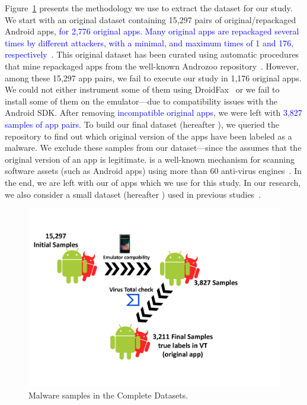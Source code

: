 Figure~\ref{fig:dataset} presents the methodology we use to extract the dataset for our study. We start with an original dataset containing 15,297
pairs of original/repackaged Android apps, \textcolor{blue}{for 2,776 original apps. Many original apps are repackaged several times by different attackers, with a minimal, and maximum times of 1 and 176, respectively}~\cite{DBLP:journals/tse/LiBK21}. This original dataset
has been curated using automatic procedures that mine repackaged apps from the well-known Androzoo repository~\cite{DBLP:conf/msr/AllixBKT16}. However, among these 15,297 app pairs, we fail to execute our study in 1,176 original apps. We could not either instrument some of them using DroidFax~\cite{DBLP:conf/icsm/CaiR17a} or we fail to install some of them on the emulator---due to compatibility issues with the Android SDK. After removing \textcolor{blue}{incompatible original apps}, we were left with \textcolor{blue}{3,827 samples of app pairs}. To build our final dataset (hereafter \cds), we queried the \vt repository to find out which original version of the apps have been labeled as a malware. We exclude these samples from our dataset---since the \mas assumes that the original version of an app is legitimate. \vt is a well-known mechanism for scanning software assets (such as Android apps) using more than 60 anti-virus
engines~\cite{DBLP:journals/ese/KhanmohammadiEH19}. In the end, we are left with our \cds of \apps apps which we use for this study.
In our research, we also consider a small dataset (hereafter \sds) used in previous studies~\cite{DBLP:conf/wcre/BaoLL18,DBLP:journals/jss/CostaMMSSBNR22}.

 \begin{figure}[htb]
  \includegraphics[width=\columnwidth]{images/dataset.pdf}
  \caption{Malware samples in the Complete Datasets.}
  \label{fig:dataset}
\end{figure}




